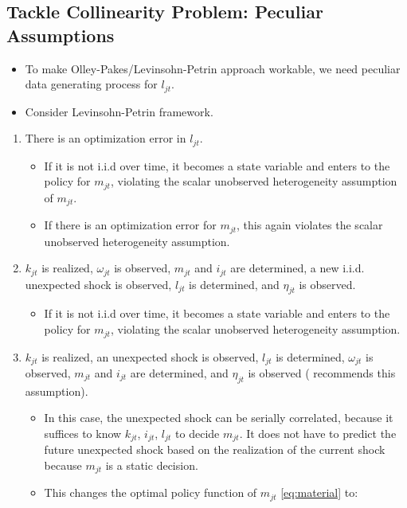 \documentclass[]{book}
\providecommand{\tightlist}{%
  \setlength{\itemsep}{0pt}\setlength{\parskip}{0pt}}
\theoremstyle{definition}
\theoremstyle{definition}
\theoremstyle{definition}
\theoremstyle{remark}
\begin{document}
\subsection{Tackle Collinearity Problem: Peculiar
Assumptions}\label{tackle-collinearity-problem-peculiar-assumptions}

\begin{itemize}
\tightlist
\item
  To make Olley-Pakes/Levinsohn-Petrin approach workable, we need
  peculiar data generating process for \(l_{jt}\).
\item
  Consider Levinsohn-Petrin framework.
\end{itemize}

\begin{enumerate}
\def\labelenumi{\arabic{enumi}.}
\tightlist
\item
  There is an optimization error in \(l_{jt}\).

  \begin{itemize}
  \tightlist
  \item
    If it is not i.i.d over time, it becomes a state variable and enters
    to the policy for \(m_{jt}\), violating the scalar unobserved
    heterogeneity assumption of \(m_{jt}\).
  \item
    If there is an optimization error for \(m_{jt}\), this again
    violates the scalar unobserved heterogeneity assumption.
  \end{itemize}
\item
  \(k_{jt}\) is realized, \(\omega_{jt}\) is observed, \(m_{jt}\) and
  \(i_{jt}\) are determined, a new i.i.d. unexpected shock is observed,
  \(l_{jt}\) is determined, and \(\eta_{jt}\) is observed.

  \begin{itemize}
  \tightlist
  \item
    If it is not i.i.d over time, it becomes a state variable and enters
    to the policy for \(m_{jt}\), violating the scalar unobserved
    heterogeneity assumption.
  \end{itemize}
\item
  \(k_{jt}\) is realized, an unexpected shock is observed, \(l_{jt}\) is
  determined, \(\omega_{jt}\) is observed, \(m_{jt}\) and \(i_{jt}\) are
  determined, and \(\eta_{jt}\) is observed (\citet{Ackerberg2016}
  recommends this assumption).

  \begin{itemize}
  \tightlist
  \item
    In this case, the unexpected shock can be serially correlated,
    because it suffices to know \(k_{jt}\), \(i_{jt}\), \(l_{jt}\) to
    decide \(m_{jt}\). It does not have to predict the future unexpected
    shock based on the realization of the current shock because
    \(m_{jt}\) is a static decision.
  \item
    This changes the optimal policy function of \(m_{jt}\)
    \eqref{eq:material} to:


\end{itemize}
\end{enumerate}
\end{document}
